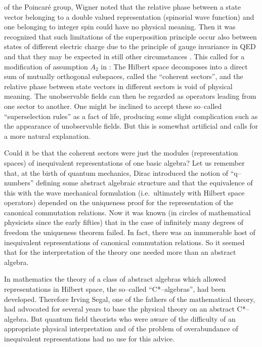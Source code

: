 of the Poincar\'e group, Wigner noted that the relative phase between a
state vector belonging to a double valued representation (spinorial
wave function) and one belonging to integer spin could have no
physical meaning. Then it was recognized that such limitations of the
superposition principle occur also between states of different
electric charge due to the principle of gauge invariance in QED and
that they may be expected in still other circumstances \cite{WiWiWi}.
This called for a modification of assumption $A_2$ in \sectwo: The
Hilbert space decomposes into a direct sum of mutually orthogonal
subspaces, called the ``coherent sectors'', and the relative phase
between state vectors in different sectors is void of physical
meaning. The unobservable fields can then be regarded as operators
leading from one sector to another. One might be inclined to accept
these so--called ``superselection rules'' as a fact of life, producing
some slight complication such as the appearance of unobservable
fields. But this is somewhat artificial and
calls for a more natural explanation.

Could it be that the coherent sectors were just the modules 
(representation spaces) of
inequivalent representations of one basic algebra? Let us remember
that, at the birth of quantum mechanics, Dirac introduced the notion of
``q--numbers'' defining some abstract algebraic structure and that the
equivalence of this with the wave mechanical formulation (i.e.\ 
ultimately with Hilbert space operators) depended on the uniqueness
proof for the representation of the canonical commutation
relations. Now it was known (in circles of mathematical physicists
since the early fifties) that in the case of infinitely many degrees
of freedom the uniqueness theorem failed. In fact, there was an 
innumerable host of inequivalent representations of canonical
commutation relations. So it seemed that for the
interpretation of the theory one needed more than an abstract
algebra. 

In mathematics
the theory of a class of abstract algebras which allowed
representations in Hilbert space, the so--called 
``C*--algebras'', had
been developed. Therefore Irving Segal, one of the fathers of the
mathematical theory, had advocated for several years to
base the physical theory on an abstract C*--algebra. But quantum field
theorists who were aware of the difficulty of an appropriate physical
interpretation and of the problem of overabundance of inequivalent
representations had no use for this advice. 

